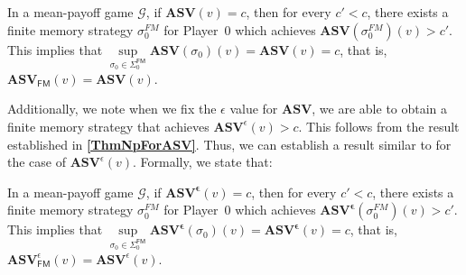\begin{corollary}
\label{CorASVEqASVFinNonEps}
In a mean-payoff game $\mathcal{G}$, if $\mathbf{ASV}(v) = c$, then for every $c' < c$, there exists a finite memory strategy $\sigma_0^{FM}$ for Player~0 which achieves $\mathbf{ASV}(\sigma_0^{FM})(v) > c'$. This implies that $\sup\limits_{\sigma_0 \in \Sigma_0^{\mathsf{FM}}} \mathbf{ASV}(\sigma_0)(v) = \mathbf{ASV}(v) = c$, that is, $\mathbf{ASV}_{\mathsf{FM}}(v) = \mathbf{ASV}(v)$.
\end{corollary}

Additionally, we note when we fix the $\epsilon$ value for $\mathbf{ASV}$, we are able to obtain a finite memory strategy that achieves $\mathbf{ASV}^{\epsilon}(v) > c$. This follows from the result established in \textbf{\cref{ThmNpForASV}}. Thus, we can establish a result similar to \textbf{} for the case of $\mathbf{ASV}^{\epsilon}(v)$. Formally, we state that:

\begin{corollary}
\label{CorASVEqASVFin}
In a mean-payoff game $\mathcal{G}$, if $\mathbf{ASV^{\epsilon}}(v) = c$, then for every $c' < c$, there exists a finite memory strategy $\sigma_0^{FM}$ for Player~0 which achieves $\mathbf{ASV^{\epsilon}}(\sigma_0^{FM})(v) > c'$. This implies that $\sup\limits_{\sigma_0 \in \Sigma_0^{\mathsf{FM}}} \mathbf{ASV^{\epsilon}}(\sigma_0)(v) = \mathbf{ASV^{\epsilon}}(v) = c$, that is, $\mathbf{ASV}^{\epsilon}_{\mathsf{FM}}(v) = \mathbf{ASV}^{\epsilon}(v)$.
\end{corollary}